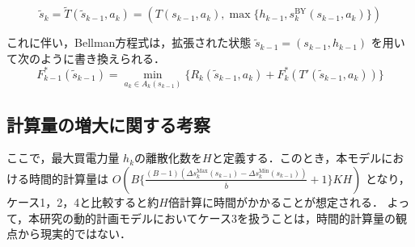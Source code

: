\begin{equation}
    \tilde{s}_k = \tilde{T}(\tilde{s}_{k-1}, a_k) = (T(s_{k-1}, a_k), \max\{h_{k-1}, s_k^{\mathrm{BY}}(s_{k-1}, a_k)\})
\end{equation}

これに伴い，Bellman方程式は，拡張された状態 $\tilde{s}_{k-1} = (s_{k-1}, h_{k-1})$ を用いて次のように書き換えられる．
\begin{equation}
    F_{k-1}^{*}(\tilde{s}_{k-1}) = \min_{a_k \in A_{k}(s_{k-1})} \{ R_k(\tilde{s}_{k-1}, a_k) + F_{k}^{*}(T'(\tilde{s}_{k-1}, a_k)) \}
\end{equation}


\subsection*{計算量の増大に関する考察}
ここで，最大買電力量 $h_k$の離散化数を$H$と定義する．このとき，本モデルにおける時間的計算量は $O(B\{ \frac{(B-1)(\Delta s_k^{\mathrm{Max}}(s_{k-1}) - \Delta s_k^{\mathrm{Min}}(s_{k-1}) )}{\overline{b}} +1\} KH)$ となり，ケース1，2，4と比較すると約$H$倍計算に時間がかかることが想定される．
よって，本研究の動的計画モデルにおいてケース3を扱うことは，時間的計算量の観点から現実的ではない．